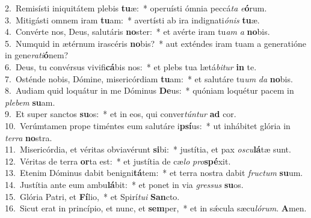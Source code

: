{2.~}Remisísti iniquitátem plebis \textbf{tu}æ:~* operuísti ómnia peccá\textit{ta} \textit{e}\textbf{ó}rum.\\
{3.~}Mitigásti omnem iram \textbf{tu}am:~* avertísti ab ira indignati\textit{ó}\textit{nis} \textbf{tu}æ.\\
{4.~}Convérte nos, Deus, salutáris \textbf{no}ster:~* et avérte iram tu\textit{am} \textit{a} \textbf{no}bis.\\
{5.~}Numquid in ætérnum irascéris \textbf{no}bis?~* aut exténdes iram tuam a generatióne in gene\textit{ra}\textit{ti}\textbf{ó}nem?\\
{6.~}Deus, tu convérsus vivifi\textbf{cá}bis nos:~* et plebs tua lætá\textit{bi}\textit{tur} \textbf{in} te.\\
{7.~}Osténde nobis, Dómine, misericórdiam \textbf{tu}am:~* et salutáre tu\textit{um} \textit{da} \textbf{no}bis.\\
{8.~}Audiam quid loquátur in me Dóminus \textbf{De}us:~* quóniam loquétur pacem in \textit{ple}\textit{bem} \textbf{su}am.\\
{9.~}Et super sanctos \textbf{su}os:~* et in eos, qui conver\textit{tún}\textit{tur} \textbf{ad} cor.\\
{10.~}Verúmtamen prope timéntes eum salutáre i\textbf{psí}us:~* ut inhábitet glória in \textit{ter}\textit{ra} \textbf{no}stra.\\
{11.~}Misericórdia, et véritas obviavérunt \textbf{si}bi:~* justítia, et pax \textit{o}\textit{scu}\textbf{lá}tæ sunt.\\
{12.~}Véritas de terra \textbf{or}ta est:~* et justítia de cæ\textit{lo} \textit{pro}\textbf{spé}xit.\\
{13.~}Etenim Dóminus dabit benigni\textbf{tá}tem:~* et terra nostra dabit \textit{fru}\textit{ctum} \textbf{su}um.\\
{14.~}Justítia ante eum ambu\textbf{lá}bit:~* et ponet in via \textit{gres}\textit{sus} \textbf{su}os.\\
{15.~}Glória Patri, et \textbf{Fí}lio,~* et Spirí\textit{tu}\textit{i} \textbf{San}cto.\\
{16.~}Sicut erat in princípio, et nunc, et \textbf{sem}per,~* et in sǽcula sæcu\textit{ló}\textit{rum}. \textbf{A}men.\\
